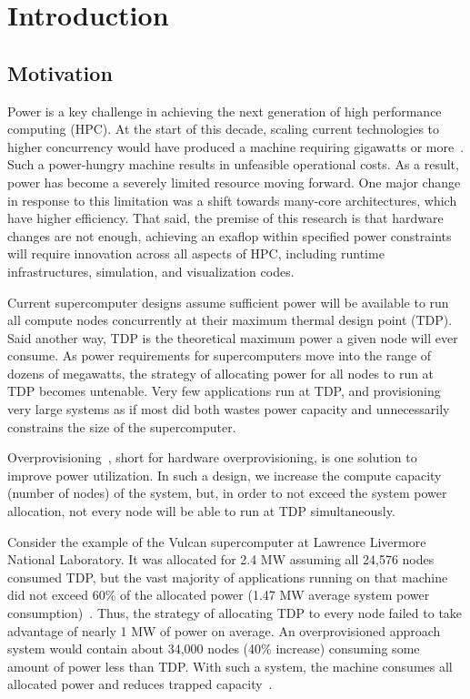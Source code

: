 \chapter{Introduction}
\label{ch:intro}

\section{Motivation}
Power is a key challenge in achieving the next generation of high performance
computing (HPC).
%
At the start of this decade, scaling current technologies to higher concurrency
would have produced a machine requiring gigawatts or
more~\cite{oppschallengesexascale,ascr2013operruntimesys,Sarkar09softwarechallenges}.
%
Such a power-hungry machine results in unfeasible operational costs.
%
As a result, power has become a severely limited resource moving forward.
%
One major change in response to this limitation was a shift towards many-core
architectures, which have higher efficiency.
%
That said, the premise of this research is that hardware changes are not
enough, \ie achieving an exaflop within specified power constraints will
require innovation across all aspects of HPC, including runtime
infrastructures, simulation, and visualization codes.

Current supercomputer designs assume sufficient power will be available to
run all compute nodes concurrently at their maximum thermal design point
(TDP).
%
Said another way, TDP is the theoretical maximum power a given node will ever
consume.
%
As power requirements for supercomputers move into the range of dozens of
megawatts, the strategy of allocating power for all nodes to run at TDP becomes
untenable.
%
Very few applications run at TDP, and provisioning very large
systems as if most did both wastes power capacity and unnecessarily
constrains the size of the supercomputer.

Overprovisioning~\cite{Patki:2013:EHO:2464996.2465009}, short for hardware
overprovisioning, is one solution to improve power utilization.
%
In such a design, we increase the compute capacity (\ie number of nodes) of the
system, but,
in order to not exceed the system power allocation,
not every node will be able to run at TDP simultaneously.

Consider the example of the Vulcan supercomputer at Lawrence Livermore National
Laboratory.
%
It was allocated for 2.4 MW assuming all 24,576 nodes consumed TDP, but the vast
majority of applications running on that machine did not exceed 60\% of the
allocated power (1.47 MW average system power
consumption)~\cite{Patki:2015:PRM:2749246.2749262}.
%
Thus, the strategy of allocating TDP to every node failed to take advantage of
nearly 1 MW of power on average.
%
An overprovisioned approach system would contain about 34,000 nodes (40\%
increase) consuming some amount of power less than TDP.
%
With such a system, the machine consumes all allocated power and reduces
trapped capacity~\cite{7016386}.

